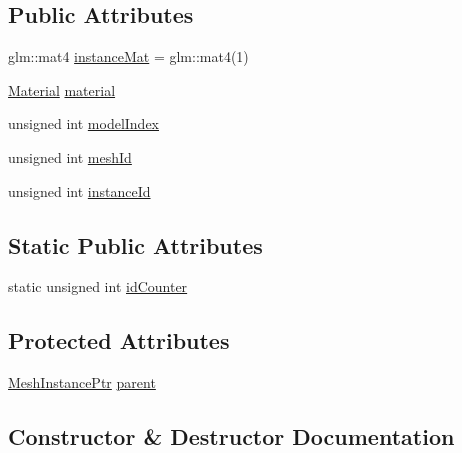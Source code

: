 \subsection*{Public Attributes}
\begin{DoxyCompactItemize}
\item 
glm\+::mat4 \hyperlink{class_mesh_instance_a4ed7a3e07affd6862213ff054caa1b30}{instance\+Mat} = glm\+::mat4(1)
\item 
\hyperlink{struct_material}{Material} \hyperlink{class_mesh_instance_adba237cd83810b3afa89f1b911997e17}{material}
\item 
unsigned int \hyperlink{class_mesh_instance_a969bc28f038cda422be9efe24c308b58}{model\+Index}
\item 
unsigned int \hyperlink{class_mesh_instance_aec954bfbb05fd9d2e4da020ca61b8c35}{mesh\+Id}
\item 
unsigned int \hyperlink{class_mesh_instance_ad3ce9b979b94b94c79d082009f2d62c7}{instance\+Id}
\end{DoxyCompactItemize}
\subsection*{Static Public Attributes}
\begin{DoxyCompactItemize}
\item 
static unsigned int \hyperlink{class_mesh_instance_abded40a314dd0d8954d22bd24cdb6de8}{id\+Counter}
\end{DoxyCompactItemize}
\subsection*{Protected Attributes}
\begin{DoxyCompactItemize}
\item 
\hyperlink{class_mesh_instance_ptr}{Mesh\+Instance\+Ptr} \hyperlink{class_mesh_instance_ad248a44f589cbeb5a8ec8748afebdcd8}{parent}
\end{DoxyCompactItemize}


\subsection{Constructor \& Destructor Documentation}
